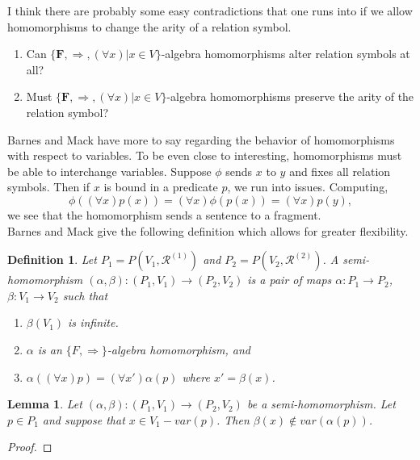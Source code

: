 \documentclass{article}
\theoremstyle{problemstyle}
\theoremstyle{lemmastyle}
\newtheorem{lemma}{Lemma}
\theoremstyle{theoremstyle}
\theoremstyle{problemstyle}
\newtheorem{definition}{Definition}
\begin{document}
I think there are probably some easy contradictions that one runs into if we allow homomorphisms to change the arity of a relation symbol.  

\begin{enumerate}
\item Can $\{\textbf{F}, \Rightarrow, (\forall x) | x \in V\}$-algebra homomorphisms alter relation symbols at all?
\item Must $\{\textbf{F}, \Rightarrow, (\forall x) | x \in V\}$-algebra homomorphisms preserve the arity of the relation symbol?
\end{enumerate}

Barnes and Mack have more to say regarding the behavior of homomorphisms with respect to variables. To be even close to interesting, homomorphisms must be able to interchange variables. Suppose $\phi$ sends $x$ to $y$ and fixes all relation symbols. Then if $x$ is bound in a predicate $p$, we run into issues. Computing, $$\phi((\forall x)p(x)) = (\forall x)\phi(p(x)) = (\forall x)p(y),$$ we see that the homomorphism sends a sentence to a fragment.\\

Barnes and Mack give the following definition which allows for greater flexibility. 

\begin{definition}
Let $P_1 = P(V_1,\mathscr{R}^{(1)})$ and $P_2 = P(V_2,\mathscr{R}^{(2)})$. A \textit{semi-homomorphism} $(\alpha,\beta):(P_1,V_1) \rightarrow (P_2,V_2)$ is a pair of maps $\alpha:P_1 \rightarrow P_2$, $\beta:V_1 \rightarrow V_2$ such that 
\begin{enumerate}
\item $\beta(V_1)$ is infinite. 
\item $\alpha$ is an $\{F, \Rightarrow\}$-algebra homomorphism, and 
\item $\alpha((\forall x)p) = (\forall x')\alpha(p)$ where $x' = \beta(x)$.  
\end{enumerate}
\end{definition}

\begin{lemma}
Let $(\alpha,\beta):(P_1,V_1) \rightarrow (P_2,V_2)$ be a semi-homomorphism. Let $p \in P_1$ and suppose that $x \in V_1-var(p)$. Then $\beta(x) \notin var(\alpha(p))$.  
\end{lemma}

\begin{proof}
\end{proof}
\end{document}
